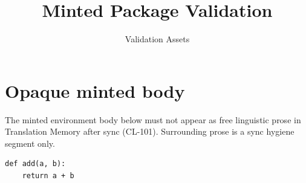 \documentclass[11pt]{article}
\title{Minted Package Validation}
\author{Validation Assets}
\date{}
\begin{document}
\maketitle

\section{Opaque minted body}
\label{sec:minted}

The minted environment body below must not appear as free linguistic prose in
Translation Memory after sync (CL-101). Surrounding prose is a sync hygiene
segment only.

\begin{verbatim}
def add(a, b):
    return a + b
\end{verbatim}
\end{document}
